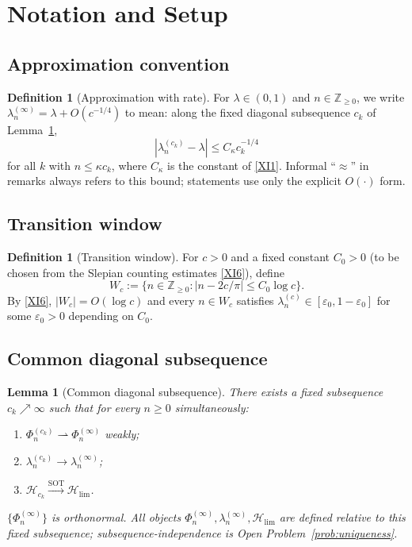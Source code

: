 \documentclass[12pt,a4paper]{amsart}
\newtheorem{lemma}[theorem]{Lemma}
\theoremstyle{definition}
\newtheorem{definition}[theorem]{Definition}
\theoremstyle{remark}
\newcommand{\Hlim}{\mathcal{H}_{\lim}}
\begin{document}
\section{Notation and Setup}
\label{sec:setup}

\subsection{Approximation convention}

\begin{definition}[Approximation with rate]
\label{conv:approx}
For $\lambda\in(0,1)$ and $n\in\mathbb{Z}_{\ge 0}$,
we write
$\lambda_n^{(\infty)} = \lambda + O(c^{-1/4})$
to mean: along the fixed diagonal subsequence
$c_k$ of Lemma~\ref{lem:diagonal},
\[
  |\lambda_n^{(c_k)} - \lambda|
  \le C_\kappa c_k^{-1/4}
\]
for all $k$ with $n\le\kappa c_k$,
where $C_\kappa$ is the constant of \eqref{XI1}.
Informal ``$\approx$'' in remarks always refers
to this bound;
statements use only the explicit $O(\cdot)$ form.
\end{definition}

\subsection{Transition window}

\begin{definition}[Transition window]
\label{def:window}
For $c>0$ and a fixed constant $C_0 > 0$
(to be chosen from the Slepian counting
estimates \eqref{XI6}), define
\[
  W_c := \bigl\{n\in\mathbb{Z}_{\ge 0} :
  |n - 2c/\pi| \le C_0\log c\bigr\}.
\]
By \eqref{XI6}, $|W_c| = O(\log c)$ and
every $n\in W_c$ satisfies
$\lambda_n^{(c)}\in[\varepsilon_0,1-\varepsilon_0]$
for some $\varepsilon_0>0$ depending on $C_0$.
\end{definition}

\subsection{Common diagonal subsequence}

\begin{lemma}[Common diagonal subsequence]
\label{lem:diagonal}
There exists a fixed subsequence
$c_k\nearrow\infty$ such that
for every $n\ge 0$ simultaneously:
\begin{enumerate}[\rm(i)]
\item $\Phi_n^{(c_k)}\rightharpoonup\Phi_n^{(\infty)}$
      weakly;
\item $\lambda_n^{(c_k)}\to\lambda_n^{(\infty)}$;
\item $\mathcal{H}_{c_k}
      \xrightarrow{\mathrm{SOT}}\Hlim$.
\end{enumerate}
$\{\Phi_n^{(\infty)}\}$ is orthonormal.
All objects $\Phi_n^{(\infty)},\lambda_n^{(\infty)},
\Hlim$ are defined relative to this fixed
subsequence; subsequence-independence
is Open Problem~\ref{prob:uniqueness}.
\end{lemma}
\end{document}
